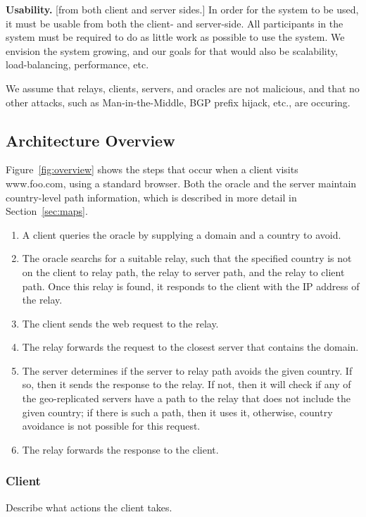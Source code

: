 {\bf Usability.} [from both client and server sides.]  In order for the system to be used, it must be usable from both the client- and server-side.  All participants in the system must be required to do as little work as possible to use the system.  We envision the system growing, and our goals for that would also be scalability, load-balancing, performance, etc.

We assume that relays, clients, servers, and oracles are not malicious, and that no other attacks, such as Man-in-the-Middle, BGP prefix hijack, etc., are occuring.  

\subsection{Architecture Overview}

Figure~\ref{fig:overview} shows the steps that occur when a client visits www.foo.com, using a standard browser.  Both the oracle and the server maintain country-level path information, which is described in more detail in Section~\ref{sec:maps}.

\begin{enumerate}
\item A client queries the oracle by supplying a domain and a country to avoid.  
\item The oracle searchs for a suitable relay, such that the specified country is not on the client to relay path, the relay to server path, and the relay to client path.  Once this relay is found, it responds to the client with the IP address of the relay.
\item The client sends the web request to the relay.
\item The relay forwards the request to the closest server that contains the domain.
\item The server determines if the server to relay path avoids the given country.  If so, then it sends the response to the relay. If not, then it will check if any of the geo-replicated servers have a path to the relay that does not include the given country; if there is such a path, then it uses it, otherwise, country avoidance is not possible for this request.
\item The relay forwards the response to the client.
\end{enumerate}

\subsubsection{Client} Describe what actions the client takes.

